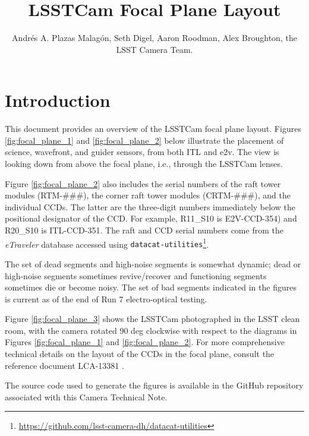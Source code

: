 \documentclass[OPS,lsstdraft,authoryear,toc]{lsstdoc}
\title{LSSTCam Focal Plane Layout}
\author{%
Andrés A. Plazas Malagón, Seth Digel, Aaron Roodman, Alex Broughton, the LSST Camera Team. 
}
\date{\vcsDate}
\begin{document}
\maketitle


\section{Introduction}
This document provides an overview of the LSSTCam focal plane layout.
Figures \ref{fig:focal_plane_1} and \ref{fig:focal_plane_2} below illustrate the placement of science, wavefront, and guider sensors, from both ITL and e2v.
The view is looking down from above the focal plane, i.e., through the LSSTCam lenses.

Figure \ref{fig:focal_plane_2} also includes the serial numbers of the raft tower modules (RTM-\#\#\#), the corner raft tower modules (CRTM-\#\#\#), and the individual CCDs.
The latter are the three-digit numbers immediately below the positional designator of the CCD.
For example, R11\_S10 is E2V-CCD-354) and R20\_S10 is ITL-CCD-351.
The raft and CCD serial numbers come from the \emph{eTraveler} database accessed using {\tt{datacat-utilities}}\footnote{\url{https://github.com/lsst-camera-dh/datacat-utilities}}.

The set of dead segments and high-noise segments is somewhat dynamic; dead or high-noise segments sometimes revive/recover and functioning segments sometimes die or become noisy.
The set of bad segments indicated in the figures is current as of the end of Run 7 electro-optical testing.

Figure \ref{fig:focal_plane_3} shows the LSSTCam photographed in the LSST clean room, with the camera rotated 90 deg clockwise with respect to the diagrams in Figures \ref{fig:focal_plane_1} and \ref{fig:focal_plane_2}.
For more comprehensive technical details on the layout of the CCDs in the focal plane, consult the reference document LCA-13381 \citep{lca13381}. 

The source code used to generate the figures is available in the GitHub repository associated with this Camera Technical Note.

\clearpage
\end{document}
